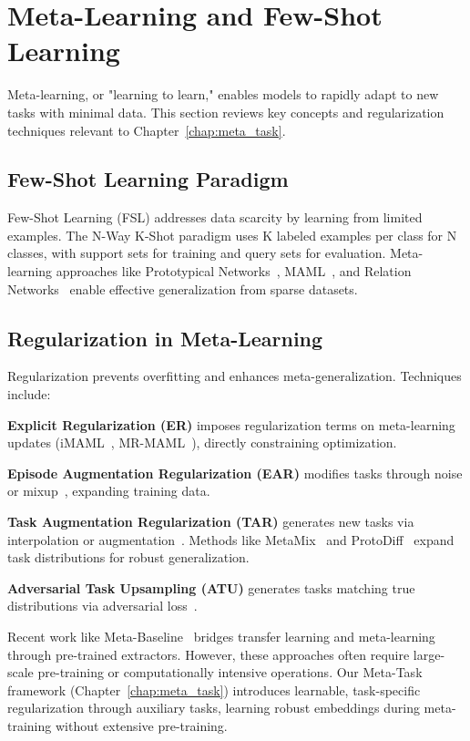 \section{Meta-Learning and Few-Shot Learning}
\label{sec:meta_learning_background}

Meta-learning, or "learning to learn," enables models to rapidly adapt to new tasks with minimal data. This section reviews key concepts and regularization techniques relevant to Chapter~\ref{chap:meta_task}.

\subsection{Few-Shot Learning Paradigm}

Few-Shot Learning (FSL) addresses data scarcity by learning from limited examples. The N-Way K-Shot paradigm uses K labeled examples per class for N classes, with support sets for training and query sets for evaluation. Meta-learning approaches like Prototypical Networks~\cite{proto}, MAML~\cite{maml}, and Relation Networks~\cite{relation} enable effective generalization from sparse datasets.

\subsection{Regularization in Meta-Learning}

Regularization prevents overfitting and enhances meta-generalization. Techniques include:

\textbf{Explicit Regularization (ER)} imposes regularization terms on meta-learning updates (iMAML~\cite{imaml}, MR-MAML~\cite{mrmaml}), directly constraining optimization.

\textbf{Episode Augmentation Regularization (EAR)} modifies tasks through noise or mixup~\cite{yamaguchi2023regularizing, shu2023dac}, expanding training data.

\textbf{Task Augmentation Regularization (TAR)} generates new tasks via interpolation or augmentation~\cite{yao2021meta, rajendran2020meta}. Methods like MetaMix~\cite{chen2021metamix} and ProtoDiff~\cite{du2023protodiff} expand task distributions for robust generalization.

\textbf{Adversarial Task Upsampling (ATU)} generates tasks matching true distributions via adversarial loss~\cite{wu2022adversarial}.

Recent work like Meta-Baseline~\cite{chen2021meta} bridges transfer learning and meta-learning through pre-trained extractors. However, these approaches often require large-scale pre-training or computationally intensive operations. Our Meta-Task framework (Chapter~\ref{chap:meta_task}) introduces learnable, task-specific regularization through auxiliary tasks, learning robust embeddings during meta-training without extensive pre-training.

